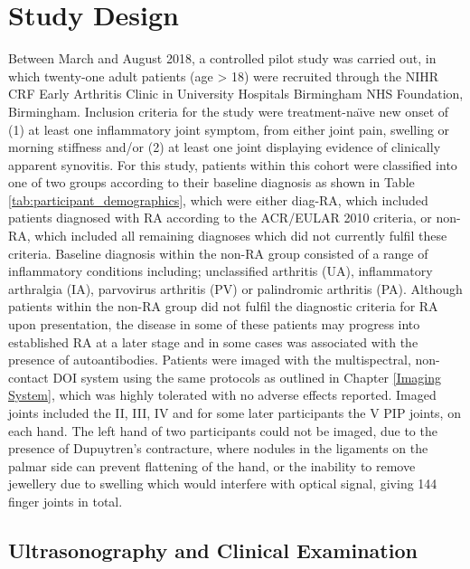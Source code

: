 \documentclass[twoside]{bhamthesis}
\theoremstyle{definition}
\begin{document}
\section{Study Design}
\label{Patient_design}
Between March and August 2018, a controlled pilot study was carried out, in which twenty-one adult patients (age > 18) were recruited through the NIHR CRF Early Arthritis Clinic in University Hospitals Birmingham NHS Foundation, Birmingham. Inclusion criteria for the study were treatment-na\"{\i}ve new onset of (1) at least one inflammatory joint symptom, from either joint pain, swelling or morning stiffness and/or (2) at least one joint displaying evidence of clinically apparent synovitis. For this study, patients within this cohort were classified into one of two groups according to their baseline diagnosis as shown in Table \ref{tab:participant_demographics}, which were either diag-RA, which included patients diagnosed with RA according to the ACR/EULAR 2010 criteria, or non-RA, which included all remaining diagnoses which did not currently fulfil these criteria. Baseline diagnosis within the non-RA group consisted of a range of inflammatory conditions including; unclassified arthritis (UA), inflammatory arthralgia (IA), parvovirus arthritis (PV) or palindromic arthritis (PA). Although patients within the non-RA group did not fulfil the diagnostic criteria for RA upon presentation, the disease in some of these patients may progress into established RA at a later stage and in some cases was associated with the presence of autoantibodies. Patients were imaged with the multispectral, non-contact DOI system using the same protocols as outlined in Chapter \ref{Imaging System}, which was highly tolerated with no adverse effects reported. Imaged joints included the II, III, IV and for some later participants the V PIP joints, on each hand. The left hand of two participants could not be imaged, due to the presence of Dupuytren's contracture, where nodules in the ligaments on the palmar side can prevent flattening of the hand, or the inability to remove jewellery due to swelling which would interfere with optical signal, giving 144 finger joints in total.

\subsection{Ultrasonography and Clinical Examination}
\end{document}
